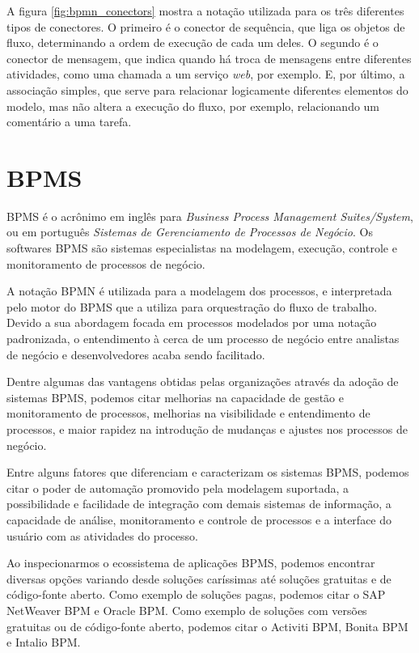     A figura \ref{fig:bpmn_conectors} mostra a notação utilizada para os três diferentes tipos de conectores. O primeiro é o conector de sequência, que liga os objetos de fluxo, determinando a ordem de execução de cada um deles. O segundo é o conector de mensagem, que indica quando há troca de mensagens entre diferentes atividades, como uma chamada a um serviço \textit{web}, por exemplo. E, por último, a associação simples, que serve para relacionar logicamente diferentes elementos do modelo, mas não altera a execução do fluxo, por exemplo, relacionando um comentário a uma tarefa. 


\section{BPMS}\label{sec:automatizacao-processos-bpms}

BPMS\cite{bpms} é o acrônimo em inglês para \textit{Business Process Management Suites/System}, ou em português \textit{Sistemas de Gerenciamento de Processos de Negócio}. Os softwares BPMS são sistemas especialistas na modelagem, execução, controle e monitoramento de processos de negócio. 

A notação BPMN é utilizada para a modelagem dos processos, e interpretada pelo motor do BPMS que a utiliza para orquestração do fluxo de trabalho. Devido a sua abordagem focada em processos modelados por uma notação padronizada, o entendimento à cerca de um processo de negócio entre analistas de negócio e desenvolvedores acaba sendo facilitado. 

Dentre algumas das vantagens obtidas pelas organizações através da adoção de sistemas BPMS, podemos citar melhorias na capacidade de gestão e monitoramento de processos, melhorias na visibilidade e entendimento de processos, e maior rapidez na introdução de mudanças e ajustes nos processos de negócio.

Entre alguns fatores que diferenciam e caracterizam os sistemas BPMS, podemos citar o poder de automação promovido pela modelagem suportada, a possibilidade e facilidade de integração com demais sistemas de informação, a capacidade de análise, monitoramento e controle de processos e a interface do usuário com as atividades do processo.

Ao inspecionarmos o ecossistema de aplicações BPMS, podemos encontrar diversas opções variando desde soluções caríssimas até soluções gratuitas e de código-fonte aberto. Como exemplo de soluções pagas, podemos citar o SAP NetWeaver BPM\cite{bpm_sap} e Oracle BPM\cite{bpm_oracle}. Como exemplo de soluções com versões gratuitas ou de código-fonte aberto, podemos citar o Activiti BPM\cite{bpm_activiti}, Bonita BPM\cite{bpm_bonita} e Intalio BPM\cite{bpm_intalio}.

